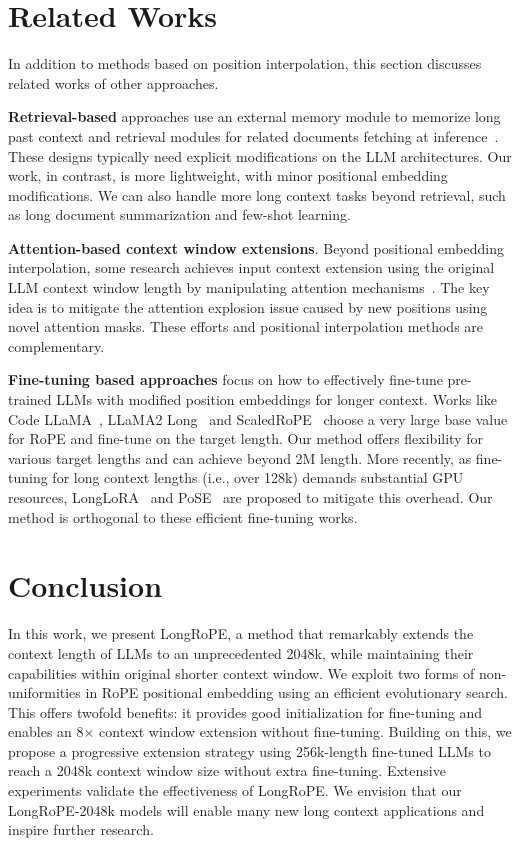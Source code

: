 \section{Related Works}

In addition to methods based on position interpolation, this section discusses related works of other approaches. 

\textbf{Retrieval-based} approaches  use an external memory module to memorize long past context and retrieval modules for related documents fetching at inference~\cite{longllama,wang2023augmenting,borgeaud2022improving}. These designs typically need explicit modifications on the LLM architectures. Our work, in contrast, is more lightweight, with minor positional embedding modifications. We can also handle more long context tasks beyond retrieval, such as long document summarization and few-shot learning. 

\textbf{Attention-based context window extensions}. Beyond positional embedding interpolation, some research achieves input context extension using the original LLM context window length by manipulating attention mechanisms~\cite{han2023lminfinite, streamingllm,parallelwindow}. The key idea is to mitigate the attention explosion issue caused by new positions using novel attention masks. These efforts and positional interpolation methods are  complementary.

\textbf{Fine-tuning based approaches} focus on how  to effectively fine-tune pre-trained LLMs with modified position embeddings for longer context. Works like Code LLaMA~\cite{codellama}, LLaMA2 Long~\cite{xiong2023effective} and ScaledRoPE~\cite{liu2023scaling} choose a very large base value for RoPE and fine-tune on the target length. Our method offers flexibility for various target lengths and can achieve beyond 2M length.  More recently, as fine-tuning for long context lengths (i.e., over 128k) demands substantial GPU resources,  LongLoRA~\cite{longlora} and PoSE~\cite{zhu2023pose} are proposed to mitigate this overhead. Our method is orthogonal to these efficient fine-tuning works.

\section{Conclusion}

In this work, we present LongRoPE, a method that remarkably extends the context length of LLMs to an unprecedented 2048k, while maintaining their  capabilities within original shorter context window. We exploit two forms of non-uniformities in RoPE positional embedding using an efficient evolutionary search. This  offers twofold benefits: it provides good  initialization for fine-tuning and enables an 8$\times$ context window extension without fine-tuning. Building on this, we  propose a progressive extension strategy using 256k-length fine-tuned LLMs to reach a 2048k context window size without extra fine-tuning. Extensive experiments validate the effectiveness of LongRoPE. We envision that our LongRoPE-2048k models will enable many new long context applications and inspire further research. 

